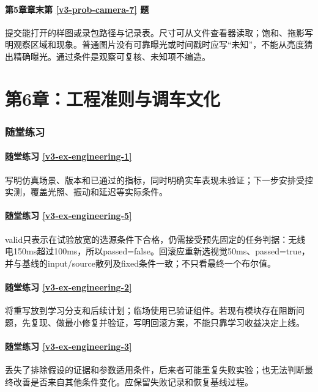 \paragraph*{第5章章末第 \ref{v3-prob-camera-7} 题}
\begin{solution}
提交能打开的样图或录包路径与记录表。尺寸可从文件查看器读取；饱和、拖影写明观察区域和现象。普通图片没有可靠曝光或时间戳时应写“未知”，不能从亮度猜出精确曝光。通过条件是观察可复核、未知项不编造。
\end{solution}

\section*{第6章：工程准则与调车文化}
{}
\subsubsection*{随堂练习}
\paragraph*{随堂练习 \ref{v3-ex-engineering-1}}
\begin{solution}
写明仿真场景、版本和已通过的指标，同时明确实车表现未验证；下一步安排受控实测，覆盖光照、振动和延迟等实际条件。
\end{solution}

\paragraph*{随堂练习 \ref{v3-ex-engineering-5}}
\begin{solution}
valid只表示在试验放宽的选源条件下合格，仍需接受预先固定的任务判据：无线电150ms超过100ms，所以passed=false。回滚应重新选视觉50ms、passed=true，并与基线的input/source散列及fixed条件一致；不只看最终一个布尔值。
\end{solution}

\paragraph*{随堂练习 \ref{v3-ex-engineering-2}}
\begin{solution}
将重写放到学习分支和后续计划；临场使用已验证组件。若现有模块存在阻断问题，先复现、做最小修复并验证，写明回滚方案，不能只靠学习收益决定上线。
\end{solution}

\paragraph*{随堂练习 \ref{v3-ex-engineering-3}}
\begin{solution}
丢失了排除假设的证据和参数适用条件，后来者可能重复失败实验；也无法判断最终改善是否来自其他条件变化。应保留失败记录和恢复基线过程。
\end{solution}

